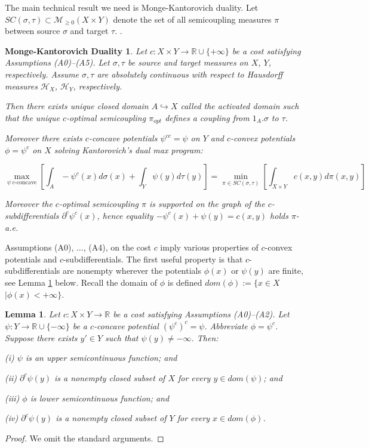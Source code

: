 \documentclass[12pt]{amsart}
\newtheorem*{mkthm}{Monge-Kantorovich Duality}
\newtheorem{lem}{Lemma}
\theoremstyle{definition}
\theoremstyle{remark}
\newcommand{\bR}{\mathbb{R}}
\newcommand{\del}{\partial}
\newcommand{\sH}{\mathscr{H}}
\begin{document}
The main technical result we need is Monge-Kantorovich duality. Let $SC(\sigma, \tau) \subset \mathscr{M}_{\geq 0} (X \times Y)$ denote the set of all semicoupling measures $\pi$ between source $\sigma$ and target $\tau$.
\cite[Theorem 5.10, pp.57]{Vil1}.
\begin{mkthm}\label{maxI}
Let $c: X\times Y \to \bR\cup\{+\infty\}$ be a cost satisfying Assumptions (A0)--(A5). Let $\sigma, \tau$ be source and target measures on $X$, $Y$, respectively. Assume $\sigma, \tau$ are absolutely continuous with respect to Hausdorff measures $\sH_X$, $\sH_Y$, respectively. 

Then there exists unique closed domain $A\hookrightarrow X$ called the activated domain such that the unique $c$-optimal semicoupling $\pi_{opt}$ defines a coupling from $1_A.\sigma$ to $\tau$. 

Moreover there exists $c$-concave potentials $\psi^{cc}=\psi$ on $Y$ and $c$-convex potentials $\phi=\psi^c$ on $X$ solving Kantorovich's dual max program: 

\begin{equation}
\max_{\psi ~c\text{-concave}} [\int_A -\psi^c(x) d\sigma(x) + \int_Y \psi(y) d\tau(y)]= \min_{\pi\in SC(\sigma, \tau)} [ \int_{X\times Y} c(x,y) d\pi(x,y)] 
\label{mkdualeq}\end{equation}

Moreover the $c$-optimal semicoupling $\pi$ is supported on the graph of the $c$-subdifferentials $\del^c \psi^c(x)$, hence equality $-\psi^c(x)+\psi(y)=c(x,y)$ holds $\pi$-a.e.

\end{mkthm}

Assumptions (A0), $\ldots$, (A4), on the cost $c$ imply various properties of $c$-convex potentials and $c$-subdifferentials. The first useful property is that $c$-subdifferentials are nonempty wherever the potentials $\phi(x)$ or $\psi(y)$ are finite, see Lemma \ref{psilem1} below. Recall the domain of $\phi$ is defined $dom(\phi):=\{x\in X$ $| \phi(x) <+\infty\}$.

\begin{lem}\label{psilem1}
Let $c: X\times Y \to \bR$ be a cost satisfying Assumptions (A0)--(A2). Let $\psi: Y\to \bR \cup \{-\infty\}$ be a $c$-concave potential $(\psi^c)^c=\psi$. Abbreviate $\phi=\psi^c$. Suppose there exists $y' \in Y$ such that $\psi(y) \neq -\infty$. Then:

(i) $\psi$ is an upper semicontinuous function; and

(ii) $\del^c \psi(y)$ is a nonempty closed subset of $X$ for every $y\in dom(\psi)$; and 

(iii) $\phi$ is lower semicontinuous function; and 

(iv) $\del^c \psi(y)$ is a nonempty closed subset of $Y$ for every $x\in dom(\phi)$. 

\end{lem}
\begin{proof}
We omit the standard arguments.



\end{proof}
\end{document}
